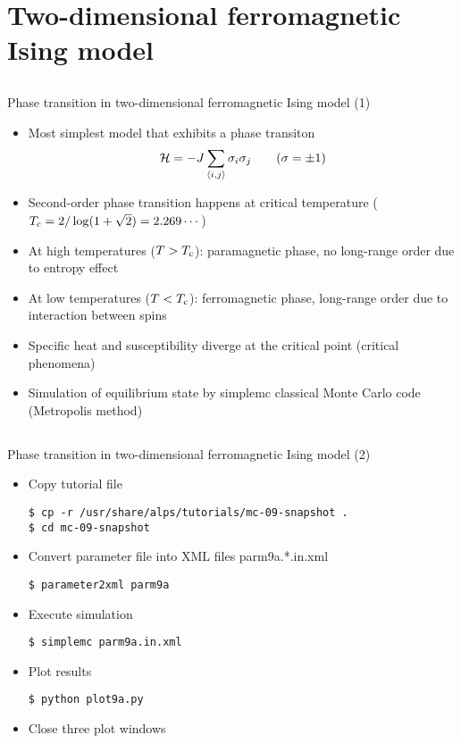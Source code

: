\section{Two-dimensional ferromagnetic Ising model}

\subsection*{\redb\whiteb\greenm}
\begin{frame}[t,fragile]{Phase transition in two-dimensional ferromagnetic Ising model (1)}
  \begin{itemize}
  \item Most simplest model that exhibits a phase transiton
    \[
      {\cal H} = - J \sum_{\langle i,j \rangle} \sigma_i \sigma_j \qquad (\sigma = \pm 1)
      \]
    \item Second-order phase transition happens  at critical temperature ($T_{\rm c} = 2/\log(1+\sqrt{2}) = 2.269\cdots$)
    \item At high temperatures ($T > T_{\rm c}$): paramagnetic phase, no long-range order due to entropy effect
    \item At low temperatures ($T < T_{\rm c}$): ferromagnetic phase, long-range order due to interaction between spins
    \item Specific heat and susceptibility diverge at the critical point (critical phenomena)
    \item Simulation of equilibrium state by simplemc classical Monte Carlo code (Metropolis method)
  \end{itemize}
\end{frame}

\subsection*{\redb\whiteb\greenm}
\begin{frame}[t,fragile]{Phase transition in two-dimensional ferromagnetic Ising model (2)}
  \begin{itemize}
  \item Copy tutorial file
\begin{lstlisting}
$ cp -r /usr/share/alps/tutorials/mc-09-snapshot .
$ cd mc-09-snapshot
\end{lstlisting}
  \item Convert parameter file into XML files parm9a.*.in.xml
\begin{lstlisting}
$ parameter2xml parm9a
\end{lstlisting}
  \item Execute simulation
\begin{lstlisting}
$ simplemc parm9a.in.xml
\end{lstlisting}
\item Plot results
\begin{lstlisting}
$ python plot9a.py
\end{lstlisting}
\item Close three plot windows
  \end{itemize}
\end{frame}

